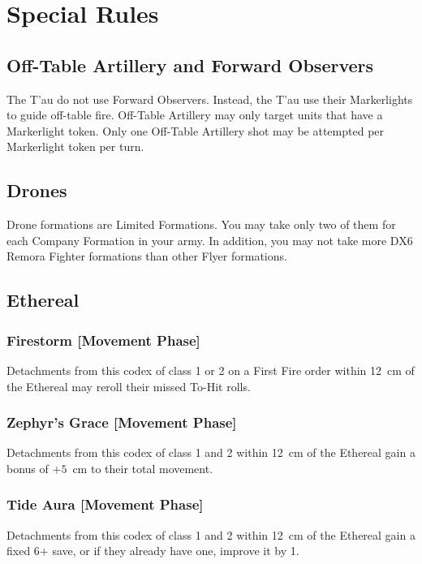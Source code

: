 \section{Special Rules}

\subsection{Off-Table Artillery and Forward Observers}

The T'au do not use Forward Observers. Instead, the T'au use their Markerlights to guide off-table fire. Off-Table Artillery may only target units that have a Markerlight token. Only one Off-Table Artillery shot may be attempted per Markerlight token per turn.

\subsection{Drones}

Drone formations are Limited Formations. You may take only two of them for each Company Formation in your army. In addition, you may not take more DX6 Remora Fighter formations than other Flyer formations.

\subsection{Ethereal}

\subsubsection{Firestorm [Movement Phase]}

Detachments from this codex of class 1 or 2 on a First Fire order within 12~cm of the Ethereal may reroll their missed To-Hit rolls.

\subsubsection{Zephyr's Grace [Movement Phase]}

Detachments from this codex of class 1 and 2 within 12~cm of the Ethereal gain a bonus of $+5$~cm to their total movement.

\subsubsection{Tide Aura [Movement Phase]}

Detachments from this codex of class 1 and 2 within 12~cm of the Ethereal gain a fixed 6+ save, or if they already have one, improve it by 1.
